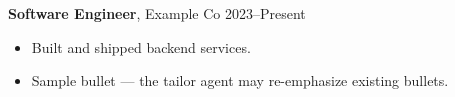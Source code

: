 \textbf{Software Engineer}, Example Co \hfill 2023--Present
\begin{itemize}
\item Built and shipped backend services.
\item Sample bullet — the tailor agent may re-emphasize existing bullets.
\end{itemize}
